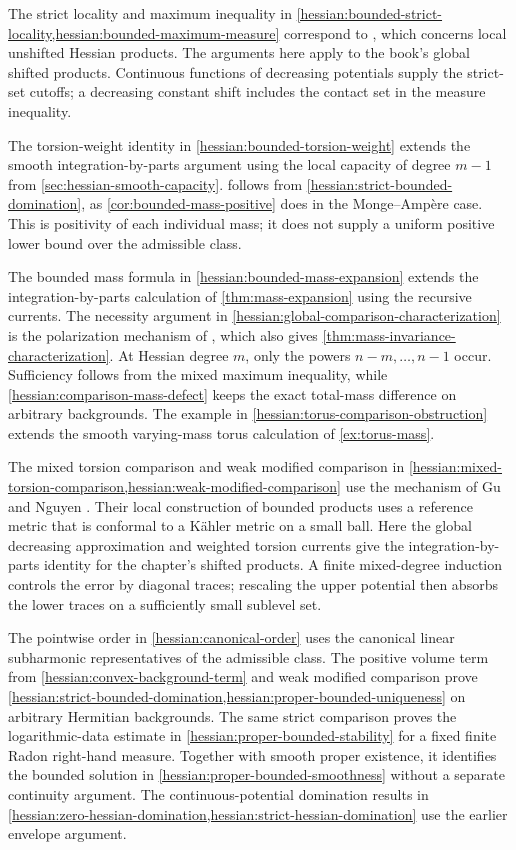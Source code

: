The strict locality and maximum inequality in
\cref{hessian:bounded-strict-locality,hessian:bounded-maximum-measure}
correspond to \cite[Corollary~5.2, p.~145]{KNHermitianMeasures26},
which concerns local unshifted Hessian products. The arguments here
apply to the book's global shifted products. Continuous functions of
decreasing potentials supply the strict-set cutoffs; a decreasing
constant shift includes the contact set in the measure inequality.

The torsion-weight identity in \cref{hessian:bounded-torsion-weight}
extends the smooth integration-by-parts argument using the local
capacity of degree $m-1$ from \cref{sec:hessian-smooth-capacity}.
 follows from
\cref{hessian:strict-bounded-domination}, as
\cref{cor:bounded-mass-positive} does in the Monge--Amp\`ere case.
This is positivity of each individual mass; it does not supply a
uniform positive lower bound over the admissible class.

The bounded mass formula in \cref{hessian:bounded-mass-expansion}
extends the integration-by-parts calculation of
\cref{thm:mass-expansion} using the recursive currents. The necessity
argument in \cref{hessian:global-comparison-characterization} is the
polarization mechanism of \cite[Theorems~1--2, pp.~576--577]{Chiose16},
which also gives \cref{thm:mass-invariance-characterization}. At
Hessian degree $m$, only the powers $n-m,\ldots,n-1$ occur.
Sufficiency follows from the mixed maximum inequality, while
\cref{hessian:comparison-mass-defect} keeps the exact total-mass
difference on arbitrary backgrounds. The example in
\cref{hessian:torus-comparison-obstruction} extends the smooth
varying-mass torus calculation of \cref{ex:torus-mass}.

The mixed torsion comparison and weak modified comparison in
\cref{hessian:mixed-torsion-comparison,hessian:weak-modified-comparison}
use the mechanism of Gu and Nguyen
\cite[Lemmas~3.8--3.10, pp.~1197--1200]{GuNguyenBoundary18}.
Their local construction of bounded products uses a reference metric
that is conformal to a K\"ahler metric on a small ball. Here the global
decreasing approximation and weighted torsion currents give the
integration-by-parts identity for the chapter's shifted products. A
finite mixed-degree induction controls the error by diagonal traces;
rescaling the upper potential then absorbs the lower traces on a
sufficiently small sublevel set.

The pointwise order in \cref{hessian:canonical-order} uses the
canonical linear subharmonic representatives of the admissible class.
The positive volume term from \cref{hessian:convex-background-term}
and weak modified comparison prove
\cref{hessian:strict-bounded-domination,hessian:proper-bounded-uniqueness}
on arbitrary Hermitian backgrounds. The same strict comparison proves
the logarithmic-data estimate in \cref{hessian:proper-bounded-stability}
for a fixed finite Radon right-hand measure. Together with smooth proper
existence, it identifies the bounded solution in
\cref{hessian:proper-bounded-smoothness} without a separate continuity
argument. The continuous-potential domination results in
\cref{hessian:zero-hessian-domination,hessian:strict-hessian-domination}
use the earlier envelope argument.


